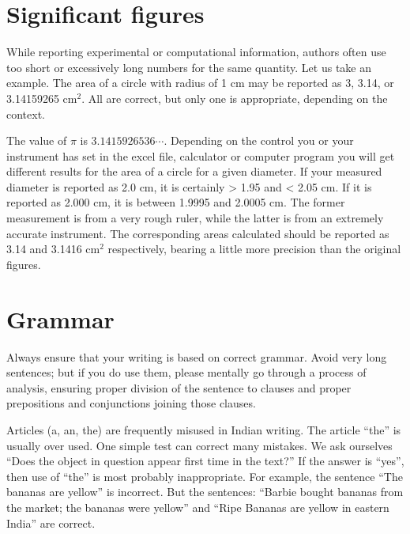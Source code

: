 \section{Significant figures} While reporting experimental or computational information, authors often use too short or excessively long numbers for the same quantity. Let us take an example. The area of a circle with radius of 1 cm may be reported as 3, 3.14, or 3.14159265 cm${^2}$. All are correct, but only one is appropriate, depending on the context.
\par The value of $\pi$ is $3.1415926536\cdots$. Depending on the control you or your instrument has set in the excel file, calculator or computer program you will get different results for the area of a circle for a given diameter. If your measured diameter is reported as 2.0 cm, it is certainly > 1.95 and < 2.05 cm. If it is reported as 2.000 cm, it is between 1.9995 and 2.0005 cm. The former measurement is from a very rough ruler, while the latter is from an extremely accurate instrument. The corresponding areas calculated should be reported as 3.14 and 3.1416 cm${^2}$ respectively, bearing a little more precision than the original figures.

\section{Grammar} Always ensure that your writing is based on correct grammar. Avoid very long sentences; but if you do use them, please mentally go through a process of analysis, ensuring proper division of the sentence to clauses and proper prepositions and conjunctions joining those clauses.
\par Articles (a, an, the) are frequently misused in Indian writing. The article “the” is usually over used. One simple test can correct many mistakes. We ask ourselves ``Does the object in question appear first time in the text?'' If the answer is “yes”, then use of “the” is most probably inappropriate. For example, the sentence “The bananas are yellow” is incorrect. But the sentences: “Barbie bought bananas from the market; the bananas were yellow” and “Ripe Bananas are yellow in eastern India” are correct.

